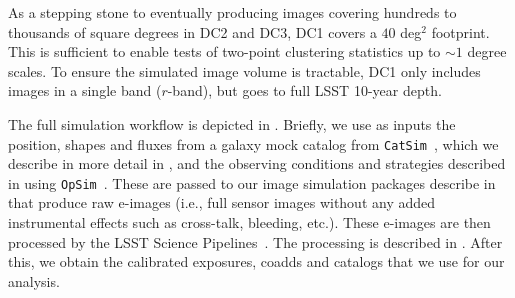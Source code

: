 \documentclass[twocolumn]{aastex62}
\newcommand{\as}[1]{{\textcolor{magenta}{{\textbf (AS: #1)}}}}
\begin{document}

As a stepping stone to eventually producing images covering hundreds to thousands of square degrees
in DC2 and DC3, DC1 covers a $40$ deg$^2$ footprint.  This is sufficient to enable tests of
two-point clustering statistics up to $\sim 1$ degree scales.  To ensure the simulated image volume is
tractable, DC1 only includes images in a single band ($r$-band), but goes to full LSST 10-year
depth. 

The full simulation workflow is depicted in . Briefly, we use as inputs the position, shapes and fluxes from a galaxy mock catalog from \texttt{CatSim}~\citep{2010SPIE.7738E..1OC,2014SPIE.9150E..14C}, which we describe in more detail in , and the observing conditions and strategies described in  using \texttt{OpSim}~\citep{2014SPIE.9150E..15D}. These are passed to our image simulation packages describe in  that produce raw e-images (i.e., full sensor images without any added instrumental effects such as cross-talk, bleeding, etc.). These e-images are then processed by the LSST Science Pipelines~\citep{2015arXiv151207914J}. The processing is described in . After this, we obtain the calibrated exposures, coadds and catalogs that we use for our analysis.
\end{document}

